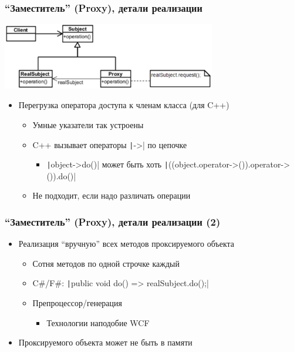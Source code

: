 \documentclass[xetex,mathserif,serif]{beamer}
\begin{document}
	\begin{frame}
		\frametitle{``Заместитель'' (Proxy), детали реализации}
		\begin{center}
			\includegraphics[width=0.7\textwidth]{proxy.png}
		\end{center}
		\begin{itemize}
			\item Перегрузка оператора доступа к членам класса (для C++)
			\begin{itemize}
				\item Умные указатели так устроены
				\item C++ вызывает операторы \texttt|->| по цепочке
				\begin{itemize}
					\item \texttt|object->do()| может быть хоть \texttt|((object.operator->()).operator->()).do()|
				\end{itemize}
				\item Не подходит, если надо различать операции
			\end{itemize}
		\end{itemize}
	\end{frame}

	\begin{frame}
		\frametitle{``Заместитель'' (Proxy), детали реализации (2)}
		\begin{itemize}
			\item Реализация ``вручную'' всех методов проксируемого объекта
			\begin{itemize}
				\item Сотня методов по одной строчке каждый
				\item C\#/F\#: \texttt|public void do() => realSubject.do();|
				\item Препроцессор/генерация
				\begin{itemize}
					\item Технологии наподобие WCF
				\end{itemize}
			\end{itemize}
			\item Проксируемого объекта может не быть в памяти
		\end{itemize}
	\end{frame}
\end{document}
